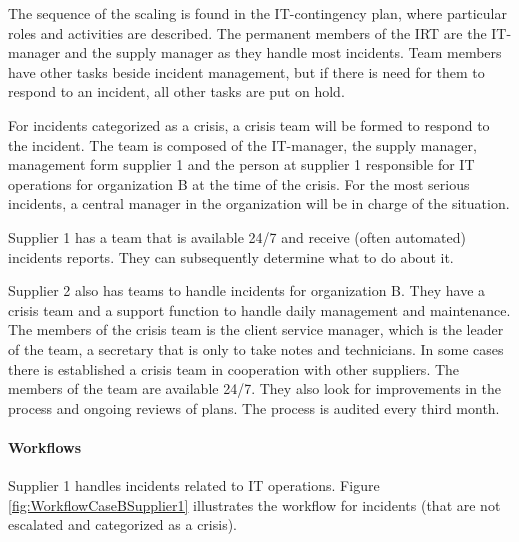 The sequence of the scaling is found in the IT-contingency plan, where particular roles and activities are described. The permanent members of the \ac{IRT} are the IT-manager and the supply manager as they handle most incidents. Team members have other tasks beside incident management, but if there is need for them to respond to an incident, all other tasks are put on hold.

For incidents categorized as a crisis, a crisis team will be formed to respond to the incident. The team is composed of the IT-manager, the supply manager, management form supplier 1 and the person at supplier 1 responsible for IT operations for organization B at the time of the crisis. For the most serious incidents, a central manager in the organization will be in charge of the situation.

Supplier 1 has a team that is available 24/7 and receive (often automated) incidents reports. They can subsequently determine what to do about it.

Supplier 2 also has teams to handle incidents for organization B. They have a crisis team and a support function to handle daily management and maintenance. The members of the crisis team is the client service manager, which is the leader of the team, a secretary that is only to take notes and technicians. In some cases there is established a crisis team in cooperation with other suppliers. The members of the team are available 24/7. They also look for improvements in the process and ongoing reviews of plans. The process is audited every third month.

\paragraph{Workflows}

Supplier 1 handles incidents related to IT operations. Figure \ref{fig:WorkflowCaseBSupplier1} illustrates the workflow for incidents (that are not escalated and categorized as a crisis).

